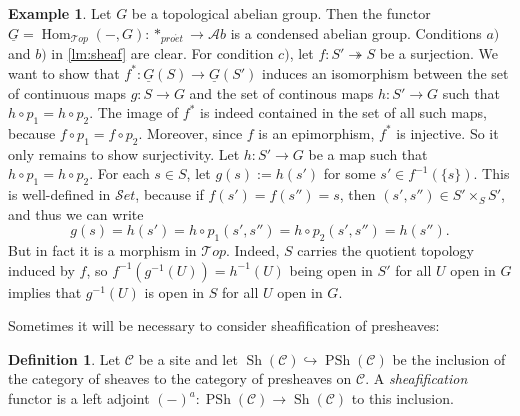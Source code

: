 \documentclass[11pt,A4]{article}
\theoremstyle{plain}
\theoremstyle{definition}
\newtheorem{defn}[thm]{Definition}
\newtheorem{exa}[thm]{Example}
\theoremstyle{remark}
\newcommand{\1}{\mathbbm{1}}
\newcommand{\scrC}{\mathscr{C}}
\newcommand{\Top}{\mathscr{T}op}
\newcommand{\Ab}{\mathscr{A}b}
\newcommand{\Set}{\mathscr{S}et}
\DeclareMathOperator{\Hom}{Hom}
\DeclareMathOperator{\PSh}{PSh}
\DeclareMathOperator{\Sh}{Sh}
\newcommand{\pe}{*_{pro\acute et}}
\renewcommand{\u}[1]{\underline{#1}}
\begin{document}
\begin{exa}
    Let $G$ be a topological abelian group. Then the functor $\u{G}=\Hom_{\Top}(-,G)\colon \pe\to \Ab$ is a condensed abelian group.
    Conditions $a)$ and $b)$ in \cref{lm:sheaf} are clear.
    For condition $c)$, let $f\colon S'\twoheadrightarrow S$ be a surjection.
    We want to show that $f^{*}\colon \u{G}(S)\to \u{G}(S')$ induces an isomorphism between the set of continuous maps $g\colon S\to G$ and the set of continous maps $h\colon S'\to G$ such that $h\circ p_{1}=h\circ p_{2}$.
    The image of $f^{*}$ is indeed contained in the set of all such maps, because $f\circ p_{1}=f\circ p_{2}$.
    Moreover, since $f$ is an epimorphism, $f^{*}$ is injective.
    So it only remains to show surjectivity.
    Let $h\colon S'\to G$ be a map such that $h\circ p_{1}=h\circ p_{2}$.
    For each $s\in S$, let $g(s):=h(s')$ for some $s'\in f^{-1}(\{s\})$.
    This is well-defined in $\Set$, because if $f(s')=f(s'')=s$, then $(s',s'')\in S'\times_{S}S'$, and thus we can write
    \[ g(s)=h(s')=h\circ p_{1}(s',s'')=h\circ p_{2}(s',s'')=h(s'').\]
    But in fact it is a morphism in $\Top$.
    Indeed, $S$ carries the quotient topology induced by $f$, so $f^{-1}(g^{-1}(U))=h^{-1}(U)$ being open in $S'$ for all $U$ open in $G$ implies that $g^{-1}(U)$ is open in $S$ for all $U$ open in $G$.
\end{exa}

Sometimes it will be necessary to consider sheafification of presheaves:

\begin{defn}
    Let $\scrC$ be a site and let $\Sh(\scrC)\hookrightarrow \PSh(\scrC)$ be the inclusion of the category of sheaves to the category of presheaves on $\scrC$. 
    A \textit{sheafification} functor is a left adjoint $(-)^{a}\colon \PSh(\scrC)\to \Sh(\scrC)$ to this inclusion.
\end{defn}
\end{document}
